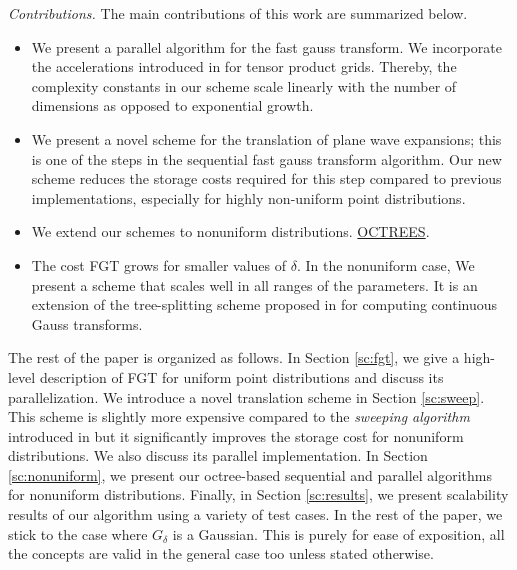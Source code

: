 {\em Contributions.} The main contributions of this work are summarized below.
\begin{itemize} 
%
\item We present a parallel algorithm for the fast gauss transform. 
We incorporate the accelerations introduced in \cite{fggt} for tensor product grids. 
Thereby, the complexity constants in our scheme scale linearly with the number of dimensions 
as opposed to exponential growth. 
%
\item We present a novel scheme for the translation of plane wave expansions; this is one
of the steps in the sequential fast gauss transform algorithm. Our new scheme reduces the 
 storage costs required for this step compared to previous implementations, especially for highly
non-uniform point distributions.
%
\item We extend our schemes to nonuniform distributions. \ul{OCTREES}.

\item The cost FGT grows for smaller values of $\delta$. In the nonuniform case, 
We present a scheme that scales well in all ranges of the parameters. It is an extension of the tree-splitting scheme 
proposed in \cite{veerapaneni08} for computing continuous Gauss transforms. 
%
\end{itemize}

The rest of the paper is organized as follows. In Section \ref{sc:fgt}, we give a high-level description of FGT for uniform point distributions and discuss its parallelization. We introduce a novel translation scheme in Section \ref{sc:sweep}. This scheme is slightly more expensive compared to the {\em sweeping algorithm} introduced in \cite{greengard98} but it 
significantly improves the storage cost for nonuniform distributions. We also discuss its parallel implementation. In Section 
\ref{sc:nonuniform}, we present our octree-based sequential and parallel algorithms for nonuniform distributions. Finally, in 
Section \ref{sc:results}, we  present scalability results of our algorithm using a variety of test cases. 
In the rest of the paper, we stick to the case where $G_\delta$ is a Gaussian. This is purely for ease of exposition, all the concepts 
are valid in the general case too unless stated otherwise. 
